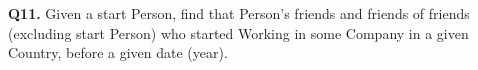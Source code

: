 \textbf{Q11.}
Given a start Person, find that Person's friends and friends of friends
(excluding start Person) who started Working in some Company in a given
Country, before a given date (year).
